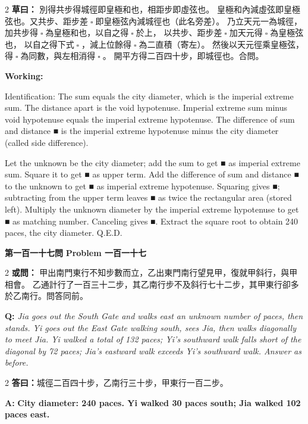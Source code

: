 \documentclass[11pt,a4paper]{article}
\let\origsquare\square
\renewcommand{\square}{\ensuremath{\origsquare}}%
\newcommand{\wen}[1]{%
  \par\vspace{0.5em}%
  \noindent\textcolor{problemcolor}{\textbf{第#1問}}%
  \hfill\textcolor{problemcolor}{\textbf{Problem #1}}\par\nopagebreak%
  \vspace{0.3em}%
}
\newcommand{\owen}[1]{%
  \noindent\textcolor{problemcolor}{\textbf{或問：}}{\tradfont #1}\par\nopagebreak%
}
\newcommand{\oweneng}[1]{%
  \noindent\textcolor{engcolor}{\textbf{Q: }}{\itshape #1}\par\nopagebreak%
}
\newcommand{\tsaoyue}[1]{%
  \noindent\textcolor{workcolor}{\textbf{草曰：}}{\tradfont #1}\par%
}
\newcommand{\tsaoyueeng}[1]{%
  \noindent\textcolor{engcolor}{\textbf{Working: }}{\small #1}\par%
}
\newcommand{\dayue}[1]{%
  \noindent\textcolor{anscolor}{\textbf{答曰：}}{\tradfont #1}\par\nopagebreak%
}
\newcommand{\dayueeng}[1]{%
  \noindent\textcolor{engcolor}{\textbf{A: }}{\bfseries #1}\par\nopagebreak%
}
\begin{document}
\begin{paracol}{2}
\tsaoyue{%
別得共步得城徑即皇極和也，相距步即虛弦也。
皇極和內減虛弦即皇極弦也。又共步、距步差$ \; \square \; $即皇極弦內減城徑也（此名旁差）。
乃立天元一為城徑，加共步得$ \; \square \; $為皇極和也，以自之得$ \; \square \; $於上，
以共步、距步差$ \; \square \; $加天元得$ \; \square \; $為皇極弦也，
以自之得下式$ \; \square \; $，減上位餘得$ \; \square \; $為二直積（寄左）。
然後以天元徑乘皇極弦，得$ \; \square \; $為同數，與左相消得$ \; \square \; $。
開平方得二百四十步，即城徑也。合問。}
\switchcolumn
\tsaoyueeng{%
Identification: The sum equals the city diameter, which is the imperial extreme sum. The distance apart is the void hypotenuse. Imperial extreme sum minus void hypotenuse equals the imperial extreme hypotenuse. The difference of sum and distance ■ is the imperial extreme hypotenuse minus the city diameter (called side difference).

Let the unknown be the city diameter; add the sum to get ■ as imperial extreme sum. Square it to get ■ as upper term. Add the difference of sum and distance ■ to the unknown to get ■ as imperial extreme hypotenuse. Squaring gives ■; subtracting from the upper term leaves ■ as twice the rectangular area (stored left). Multiply the unknown diameter by the imperial extreme hypotenuse to get ■ as matching number. Canceling gives ■. Extract the square root to obtain 240 paces, the city diameter. Q.E.D.}
\end{paracol}

\vspace{0.5cm}

\wen{一百一十七}

\begin{paracol}{2}
\owen{%
甲出南門東行不知步數而立，乙出東門南行望見甲，復就甲斜行，與甲相會。
乙通計行了一百三十二步，其乙南行步不及斜行七十二步，其甲東行卻多於乙南行。問答同前。}
\switchcolumn
\oweneng{%
Jia goes out the South Gate and walks east an unknown number of paces, then stands. Yi goes out the East Gate walking south, sees Jia, then walks diagonally to meet Jia. Yi walked a total of 132 paces; Yi's southward walk falls short of the diagonal by 72 paces; Jia's eastward walk exceeds Yi's southward walk. Answer as before.}
\end{paracol}

\begin{paracol}{2}
\dayue{城徑二百四十步，乙南行三十步，甲東行一百二步。}
\switchcolumn
\dayueeng{City diameter: 240 paces. Yi walked 30 paces south; Jia walked 102 paces east.}
\end{paracol}
\end{document}
